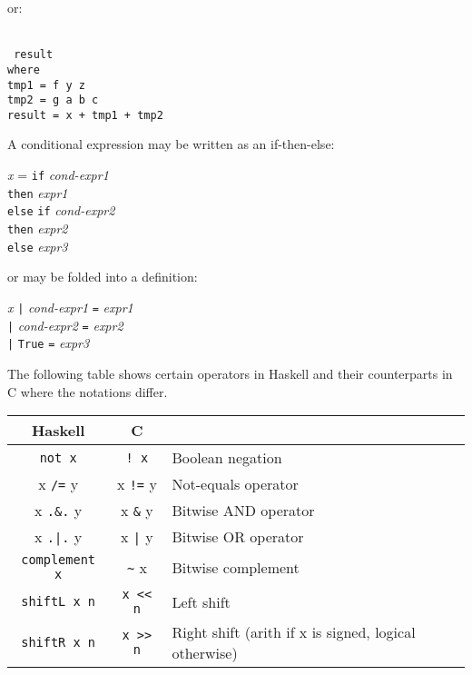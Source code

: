 \documentclass[11pt]{article}
\newcommand{\hmm}{\hspace*{2em}}
\newcommand{\hmmm}{\hspace*{3em}}
\newcommand{\hmmmm}{\hspace*{4em}}
\begin{document}
or: \\
\hmmmm \
\begin{minipage}[t]{4in}\tt
result \\
where \\
\hmm tmp1 = f y z \\
\hmm tmp2 = g a b c \\
\hmm result = x + tmp1 + tmp2
\end{minipage}

A conditional expression may be written as an if-then-else:
\begin{tabbing}
\hmmm \= \emph{x} = \= {\tt if} \emph{cond-expr1} \\
      \>            \> {\tt then} \emph{expr1} \\
      \>            \> {\tt else} \= {\tt if} \emph{cond-expr2} \\
      \>            \>            \> {\tt then} \emph{expr2} \\
      \>            \>            \> {\tt else} \emph{expr3}
\end{tabbing}
or may be folded into a definition:
\begin{tabbing}
\hmmm \= \emph{x} \= {\tt |} \emph{cond-expr1} \= {\tt =} \emph{expr1} \\
      \>          \> {\tt |} \emph{cond-expr2} \> {\tt =} \emph{expr2} \\
      \>          \> {\tt |} {\tt True}        \> {\tt =} \emph{expr3}
\end{tabbing}

The following table shows certain operators in Haskell and their
counterparts in C where the notations differ.

\begin{tabular}{|c|c|l|}
\hline
Haskell           & C             & \\
\hline
\verb|not x|        & \verb|! x|    & Boolean negation \\
x \verb|/=| y       & x \verb|!=| y & Not-equals operator \\
x \verb|.&.| y      & x \verb|&| y  & Bitwise AND operator \\
x \verb/.|./ y      & x \verb/|/ y  & Bitwise OR operator \\
\verb|complement x| & \verb|~| x    & Bitwise complement \\
\verb|shiftL x n|   & \verb|x << n| & Left shift  \\
\verb|shiftR x n|   & \verb|x >> n| & Right shift (arith if x is signed, logical otherwise) \\
\hline
\end{tabular}
\end{document}
